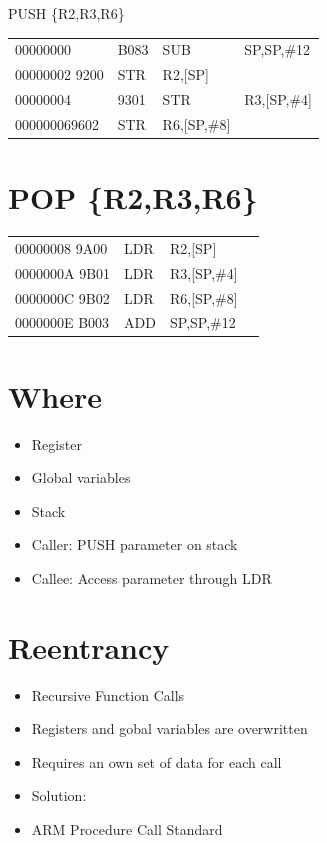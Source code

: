 \documentclass[10pt]{article}
\begin{document}
PUSH \{R2,R3,R6\}

\begin{center}
\begin{tabular}{llll}
00000000 & B083 & SUB & SP,SP,\#12 \\
00000002 9200 & STR & R2,[SP] &  \\
00000004 & 9301 & STR & R3,[SP,\#4] \\
000000069602 & STR & R6,[SP,\#8] &  \\
\end{tabular}
\end{center}

\section*{POP \{R2,R3,R6\}}
\begin{center}
\begin{tabular}{|llll|}
\hline
00000008 9A00 & LDR & R2,[SP] \\
0000000A 9B01 & LDR & R3,[SP,\#4] \\
0000000C 9B02 & LDR & R6,[SP,\#8] \\
0000000E B003 & ADD & SP,SP,\#12 \\
\hline
\end{tabular}
\end{center}

\section*{Where}
\begin{itemize}
  \item Register
  \item Global variables
  \item Stack
  \item Caller: PUSH parameter on stack
  \item Callee: Access parameter through LDR
\end{itemize}

\section*{Reentrancy}
\begin{itemize}
  \item Recursive Function Calls
  \item Registers and gobal variables are overwritten
  \item Requires an own set of data for each call
  \item Solution:
  \item ARM Procedure Call Standard
\end{itemize}
\end{document}
